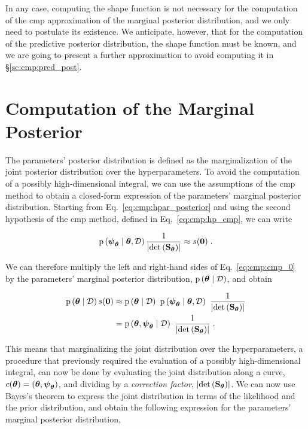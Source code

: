 In any case, computing the shape function is not necessary for the computation of the \gls{cmp} approximation of the marginal posterior distribution, and we only need to postulate its existence. We anticipate, however, that for the computation of the predictive posterior distribution, the shape function must be known, and we are going to present a further approximation to avoid computing it in \S\ref{sc:cmp:pred_post}.

\section{Computation of the Marginal Posterior}
\label{sc:cmp:par_post}

The parameters' posterior distribution is defined as the marginalization of the joint posterior distribution over the hyperparameters. To avoid the computation of a possibly high-dimensional integral, we can use the assumptions of the \gls{cmp} method to obtain a closed-form expression of the parameters' marginal posterior distribution. Starting from Eq.~\eqref{eq:cmp:hpar_posterior} and using the second hypothesis of the \gls{cmp} method, defined in Eq.~\eqref{eq:cmp:hp_cmp}, we can write

\begin{equation}
    \mathrm{p} \left( \boldsymbol{\psi}_{\boldsymbol{\theta}} \mid \boldsymbol{\theta}, \mathcal{D} \right) \dfrac{1}{\left| \mathrm{det}\left(\mathbf{S}_{\boldsymbol{\theta}}\right) \right|} \approx s(\boldsymbol{0})  \; .
    \label{eq:cmp:cmp_0}
\end{equation}

We can therefore multiply the left and right-hand sides of Eq.~\eqref{eq:cmp:cmp_0} by the parameters' marginal posterior distribution, $\mathrm{p} \left( \boldsymbol{\theta} \mid \mathcal{D} \right)$, and obtain

\begin{equation}
    \left.
        \begin{aligned}
            \p{\btheta \mid \data} s(\boldsymbol{0}) &\approx \p{\btheta \mid \data} \  \p{\psimap \mid \btheta, \data} \ \dfrac{1}{\abs{\detf{\Stheta}}}\\
            &= \p{\btheta, \psimap \mid \data} \ \dfrac{1}{\abs{\detf{\Stheta}}}\;.
        \end{aligned}
    \right.
    \label{eq:cmp_1}
\end{equation}

This means that marginalizing the joint distribution over the hyperparameters, a procedure that previously required the evaluation of a possibly high-dimensional integral, can now be done by evaluating the joint distribution along a curve, $c(\boldsymbol{\theta})=\left(\boldsymbol{\theta}, \boldsymbol{\psi}_{\boldsymbol{\theta}}\right)$, and dividing by a \textit{correction factor}, $\left| \mathrm{det}\left(\mathbf{S}_{\boldsymbol{\theta}}\right) \right|$. We can now use Bayes's theorem to express the joint distribution in terms of the likelihood and the prior distribution, and obtain the following expression for the parameters' marginal posterior distribution,

